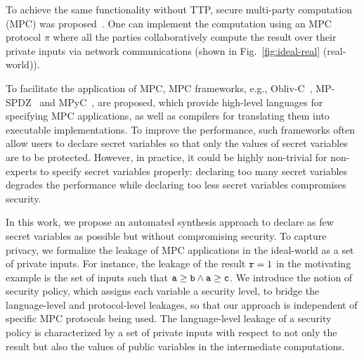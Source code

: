 To achieve the same functionality without TTP, secure multi-party computation (MPC) was proposed~\cite{Yao86,ChaumCD88,GMW,yao82,EvansKR18}. %
One can implement the computation using an MPC protocol $\pi$  where
all the parties collaboratively compute the result over their private inputs
via network communications (shown in Fig.~\ref{fig:ideal-real} (real-world)).

To facilitate the application of MPC, MPC frameworks, e.g., Obliv-C~\cite{ZahurE15}, MP-SPDZ~\cite{spdz20} and MPyC~\cite{MPyC20}, are proposed, which provide high-level languages
for %
specifying MPC applications, as well as compilers for translating them into executable implementations.
To improve the performance, such frameworks often allow users to declare secret variables so that only
the values of secret variables are to be protected.
However, in practice, it could be highly non-trivial for non-experts to specify secret variables properly:
declaring too many secret variables degrades the performance while
declaring too less secret variables compromises security.

In this work, we propose an automated synthesis approach %
to declare as few secret variables as possible but without compromising security.
To capture privacy, we formalize the leakage of MPC applications in the ideal-world as a set of %
private inputs. For instance, the leakage of the result ${\tt r}=1$ in the motivating example
is the set of inputs %
such that
${\tt a}\geq{\tt b} \wedge {\tt a}\geq{\tt c}$.
We introduce the notion of security policy, which assigns each variable a security level, to bridge the language-level and protocol-level leakages, so that our approach is independent of specific MPC protocols being used.
The language-level leakage of a security policy is characterized by a set of %
private inputs with respect to not only the result but also the values of public variables
in the intermediate computations.


